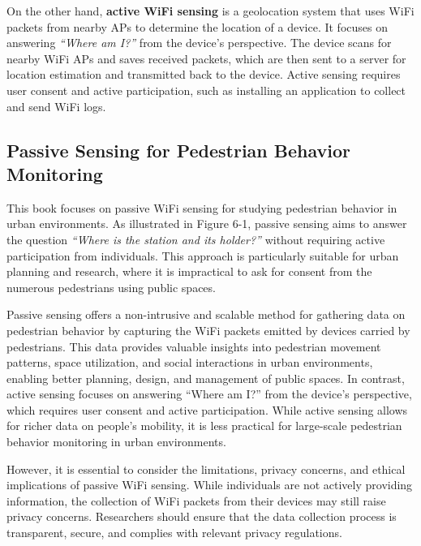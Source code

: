 \documentclass[
  letterpaper,
]{scrbook}
\begin{document}
On the other hand, \textbf{active WiFi sensing} is a geolocation system
that uses WiFi packets from nearby APs to determine the location of a
device. It focuses on answering \emph{``Where am I?''} from the device's
perspective. The device scans for nearby WiFi APs and saves received
packets, which are then sent to a server for location estimation and
transmitted back to the device. Active sensing requires user consent and
active participation, such as installing an application to collect and
send WiFi logs.

\subsection*{Passive Sensing for Pedestrian Behavior
Monitoring}\label{passive-sensing-for-pedestrian-behavior-monitoring}

This book focuses on passive WiFi sensing for studying pedestrian
behavior in urban environments. As illustrated in Figure 6-1, passive
sensing aims to answer the question \emph{``Where is the station and its
holder?''} without requiring active participation from individuals. This
approach is particularly suitable for urban planning and research, where
it is impractical to ask for consent from the numerous pedestrians using
public spaces.

Passive sensing offers a non-intrusive and scalable method for gathering
data on pedestrian behavior by capturing the WiFi packets emitted by
devices carried by pedestrians. This data provides valuable insights
into pedestrian movement patterns, space utilization, and social
interactions in urban environments, enabling better planning, design,
and management of public spaces. In contrast, active sensing focuses on
answering ``Where am I?'' from the device's perspective, which requires
user consent and active participation. While active sensing allows for
richer data on people's mobility, it is less practical for large-scale
pedestrian behavior monitoring in urban environments.

However, it is essential to consider the limitations, privacy concerns,
and ethical implications of passive WiFi sensing. While individuals are
not actively providing information, the collection of WiFi packets from
their devices may still raise privacy concerns. Researchers should
ensure that the data collection process is transparent, secure, and
complies with relevant privacy regulations.
\end{document}

